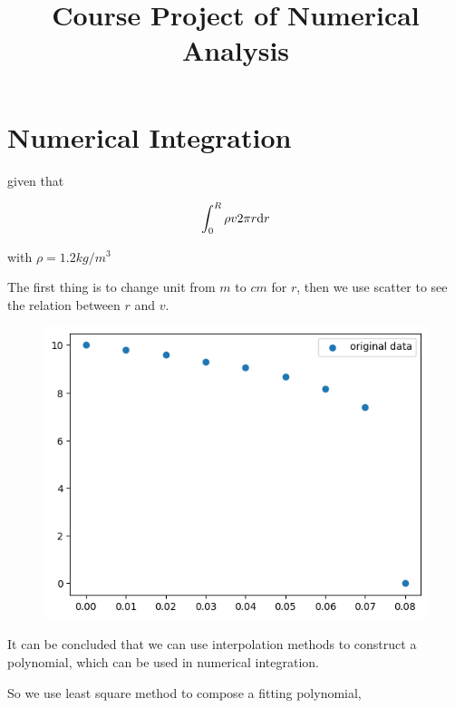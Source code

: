 \documentclass[conference]{IEEEtran}
\begin{document}
\title{Course Project of Numerical Analysis}

\author{
}

\maketitle



\section{Numerical Integration}

given that

$$
\int_0^R \rho v2 \pi r {\rm d}r
$$

with $\rho =1.2kg/m^3$

The first thing is to change unit from $m$ to $cm$ for $r$, 
then we use scatter to see the relation between $r$ and $v$.

\begin{figure}[htbp]
	\centerline{\includegraphics[width=0.85\columnwidth]{1-1.png}}
\end{figure}

It can be concluded that we can use interpolation methods to construct a polynomial,
which can be used in numerical integration.

So we use least square method to compose a fitting polynomial,
\end{document}
